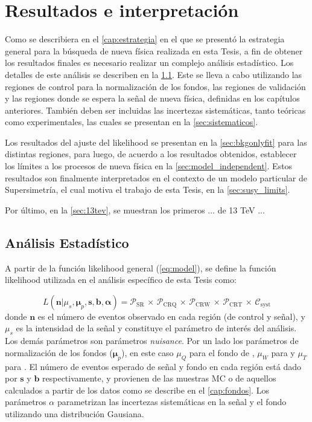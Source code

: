 \chapter{Resultados e interpretación}
\label{cap:resultados}

Como se describiera en el \cref{cap:estrategia} en el que se presentó la
estrategia general para la búsqueda de nueva física realizada en esta Tesis, a
fin de obtener los resultados finales es necesario realizar un complejo análisis
estadístico. Los detalles de este análisis se describen en la
\cref{sec:analisis}. Este se lleva a cabo utilizando las regiones de control
para la normalización de los fondos, las regiones de validación y las regiones
donde se espera la señal de nueva física, definidas en los capítulos anteriores.
También deben ser incluidas las incertezas sistemáticas, tanto teóricas como
experimentales, las cuales se presentan en la \cref{sec:sistematicos}.

Los resultados del ajuste del likelihood se presentan en la
\cref{sec:bkgonlyfit} para las distintas regiones, para luego, de acuerdo a los
resultados obtenidos, establecer los límites a los procesos de nueva física en
la \cref{sec:model_independent}. Estos resultados son finalmente interpretados
en el contexto de un modelo particular de Supersimetría, el cual motiva el
trabajo de esta Tesis, en la \cref{sec:susy_limits}.

Por último, en la \cref{sec:13tev}, se muestran los primeros ... de 13 TeV ...


\section{Análisis Estadístico}
\label{sec:analisis}

A partir de la función likelihood general (\cref{eq:model}), se define la
función likelihood utilizada en el análisis específico de esta Tesis como:

\begin{equation}
  L(\bm{n}|\mu_s, \bm{\mu}_p, \bm{s}, \bm{b}, \bm{\alpha}) = \mathcal{P}_\text{SR} \, \times \, \mathcal{P}_\text{CRQ} \, \times \, \mathcal{P}_\text{CRW} \, \times \, \mathcal{P}_\text{CRT} \, \times \, \mathcal{C}_\text{syst}
  \label{eq:likelihood}
\end{equation}
%
donde $\bm{n}$ es el número de eventos observado en cada región (de control y
señal), y $\mu_s$ es la intensidad de la señal y constituye el parámetro de
interés del análisis. Los demás parámetros son parámetros \emph{nuisance}. Por
un lado los parámetros de normalización de los fondos ($\bm{\mu}_p$), en este
caso $\mu_Q$ para el fondo de {\gjet}, $\mu_W$ para {\wgam} y $\mu_T$ para
{\ttgam}. El número de eventos esperado de señal y fondo en cada región está
dado por $\bm{s}$ y $\bm{b}$ respectivamente, y provienen de las muestras MC o
de aquellos calculados a partir de los datos como se describe en el
\cref{cap:fondos}. Los parámetros $\alpha$ parametrizan las incertezas
sistemáticas en la señal y el fondo utilizando una distribución Gausiana.

